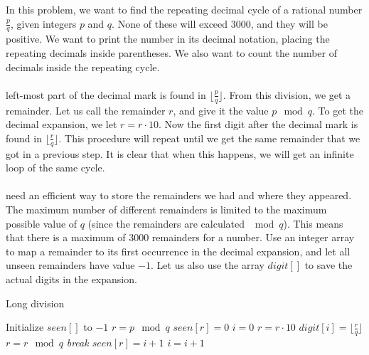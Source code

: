 \documentclass[11pt,a4paper,twoside]{article}
\begin{document}
In this problem, we want to find the repeating decimal cycle of a rational
number $\frac{p}{q}$, given integers $p$ and $q$. None of these will exceed
$3000$, and they will be positive. We want to print the number in its decimal
notation, placing the repeating decimals inside parentheses. We also want to
count the number of decimals inside the repeating cycle.
\\\\
 left-most part of the decimal mark is found in
$\lfloor{\frac{p}{q}}\rfloor$. From this division, we get a remainder. Let us
call the remainder $r$, and give it the value $p \mod q$. To get the decimal
expansion, we let $r = r \cdot 10$. Now the first digit after the decimal mark
is found in $\lfloor{\frac{r}{q}}\rfloor$. This procedure will repeat until we
get the same remainder that we got in a previous step. It is clear that when
this happens, we will get an infinite loop of the same cycle.
\\\\
 need an efficient way to store the remainders we had and where
they appeared. The maximum number of different remainders is limited to the
maximum possible value of $q$ (since the remainders are calculated $\mod q$).
This means that there is a maximum of $3000$ remainders for a number. Use an
integer array to map a remainder to its first occurrence in the decimal
expansion, and let all unseen remainders have value $-1$.  Let us also use the
array $digit[]$ to save the actual digits in the expansion.


\begin{algorithm}
    \caption{Long division}
    \label{lst:Long division}
    \begin{algorithmic}
        \STATE Initialize $seen[]$ to $-1$
        \STATE $r = p \mod q$
        \STATE $seen[r] = 0$ 
        \STATE $i = 0$
            \STATE $r = r \cdot 10$
            \STATE $digit[i] = \lfloor\frac{r}{q}\rfloor$
            \STATE $r = r \mod q$
                \STATE {}
                \STATE \em{break} %
            \ENDIF
            \STATE $seen[r] = i + 1 $
            \STATE $ i = i + 1$
        \ENDWHILE
    \end{algorithmic}
\end{algorithm}
\end{document}
